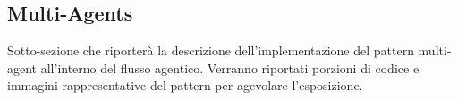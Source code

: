 \subsection{Multi-Agents}

Sotto-sezione che riporterà la descrizione dell'implementazione del pattern multi-agent all'interno del flusso agentico.
Verranno riportati porzioni di codice e immagini rappresentative del pattern per agevolare l'esposizione.